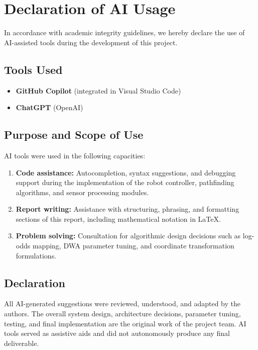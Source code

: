 \documentclass{article}
\begin{document}
\newpage

\section{Declaration of AI Usage}

In accordance with academic integrity guidelines, we hereby declare the use of AI-assisted tools during the development of this project.

\subsection{Tools Used}

\begin{itemize}
    \item \textbf{GitHub Copilot} (integrated in Visual Studio Code)
    \item \textbf{ChatGPT} (OpenAI)
\end{itemize}

\subsection{Purpose and Scope of Use}

AI tools were used in the following capacities:

\begin{enumerate}
    \item \textbf{Code assistance:} Autocompletion, syntax suggestions, and debugging support during the implementation of the robot controller, pathfinding algorithms, and sensor processing modules.
    \item \textbf{Report writing:} Assistance with structuring, phrasing, and formatting sections of this report, including mathematical notation in \LaTeX.
    \item \textbf{Problem solving:} Consultation for algorithmic design decisions such as log-odds mapping, DWA parameter tuning, and coordinate transformation formulations.
\end{enumerate}

\subsection{Declaration}

All AI-generated suggestions were reviewed, understood, and adapted by the authors. The overall system design, architecture decisions, parameter tuning, testing, and final implementation are the original work of the project team. AI tools served as assistive aids and did not autonomously produce any final deliverable.
\end{document}
